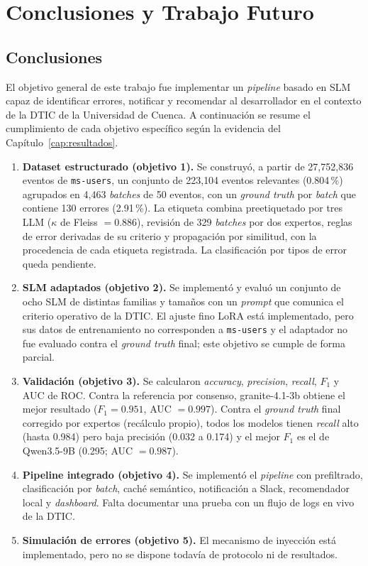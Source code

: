 \chapter{Conclusiones y Trabajo Futuro} \label{cap:conclusiones}

\section{Conclusiones}\label{sec:conclusiones}

El objetivo general de este trabajo fue implementar un \textit{pipeline} basado en SLM capaz de identificar errores, notificar y recomendar al desarrollador en el contexto de la DTIC de la Universidad de Cuenca. A continuación se resume el cumplimiento de cada objetivo específico según la evidencia del Capítulo~\ref{cap:resultados}.

\begin{enumerate}
  \item \textbf{Dataset estructurado (objetivo 1).} Se construyó, a partir de 27{,}752{,}836 eventos de \texttt{ms-users}, un conjunto de 223{,}104 eventos relevantes (0.804\,\%) agrupados en 4{,}463 \textit{batches} de 50 eventos, con un \textit{ground truth} por \textit{batch} que contiene 130 errores (2.91\,\%). La etiqueta combina preetiquetado por tres LLM ($\kappa$ de Fleiss $=0.886$), revisión de 329 \textit{batches} por dos expertos, reglas de error derivadas de su criterio y propagación por similitud, con la procedencia de cada etiqueta registrada. La clasificación por tipos de error queda pendiente.
  \item \textbf{SLM adaptados (objetivo 2).} Se implementó y evaluó un conjunto de ocho SLM de distintas familias y tamaños con un \textit{prompt} que comunica el criterio operativo de la DTIC. El ajuste fino LoRA está implementado, pero sus datos de entrenamiento no corresponden a \texttt{ms-users} y el adaptador no fue evaluado contra el \textit{ground truth} final; este objetivo se cumple de forma parcial.
  \item \textbf{Validación (objetivo 3).} Se calcularon \textit{accuracy}, \textit{precision}, \textit{recall}, $F_1$ y AUC de ROC. Contra la referencia por consenso, granite-4.1-3b obtiene el mejor resultado ($F_1=0.951$, AUC $=0.997$). Contra el \textit{ground truth} final corregido por expertos (recálculo propio), todos los modelos tienen \textit{recall} alto (hasta 0.984) pero baja precisión (0.032 a 0.174) y el mejor $F_1$ es el de Qwen3.5-9B (0.295; AUC $=0.987$).
  \item \textbf{Pipeline integrado (objetivo 4).} Se implementó el \textit{pipeline} con prefiltrado, clasificación por \textit{batch}, caché semántico, notificación a Slack, recomendador local y \textit{dashboard}. Falta documentar una prueba con un flujo de logs en vivo de la DTIC.
  \item \textbf{Simulación de errores (objetivo 5).} El mecanismo de inyección está implementado, pero no se dispone todavía de protocolo ni de resultados.
\end{enumerate}

